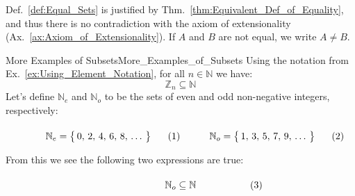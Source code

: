         Def.~\ref{def:Equal_Sets} is justified by
        Thm.~\ref{thm:Equivalent_Def_of_Equality}, and thus there is no
        contradiction with the axiom of extensionality
        (Ax.~\ref{ax:Axiom_of_Extensionality}). If $A$ and $B$ are not equal, we
        write $A\ne{B}$. 
        \begin{lexample}{More Examples of Subsets}{More_Examples_of_Subsets}
            Using the notation from Ex.~\ref{ex:Using_Element_Notation}, for all
            $n\in\mathbb{N}$ we have:
            \begin{equation}
                \mathbb{Z}_{n}\subseteq\mathbb{N}
            \end{equation}
            Let's define $\mathbb{N}_{e}$ and $\mathbb{N}_{o}$ to be the sets of
            even and odd non-negative
            integers, respectively:
            \par
            \begin{subequations}
                \begin{minipage}[b]{0.49\textwidth}
                    \begin{equation}
                        \label{eqn:Even_Pos_Ints_Ellipses}%
                        \mathbb{N}_{e}=\big\{\,0,\,2,\,4,\,6,\,8,\,\dots\,\big\}
                    \end{equation}
                \end{minipage}
                \hfill
                \begin{minipage}[b]{0.49\textwidth}
                    \begin{equation}
                        \label{eqn:Odd_Pos_Ints_Ellipses}%
                        \mathbb{N}_{o}=\big\{\,1,\,3,\,5,\,7,\,9,\,\dots\,\big\}
                    \end{equation}
                \end{minipage}
            \end{subequations}
            \par\vspace{2.5ex}
            From this we see the following two expressions are true:
            \par\hfill\par
            \begin{subequations}
                \begin{minipage}[b]{0.49\textwidth}
                    \begin{equation}
                        \mathbb{N}_{o}\subseteq\mathbb{N}

\end{equation}
\end{minipage}
\end{subequations}
\end{lexample}
